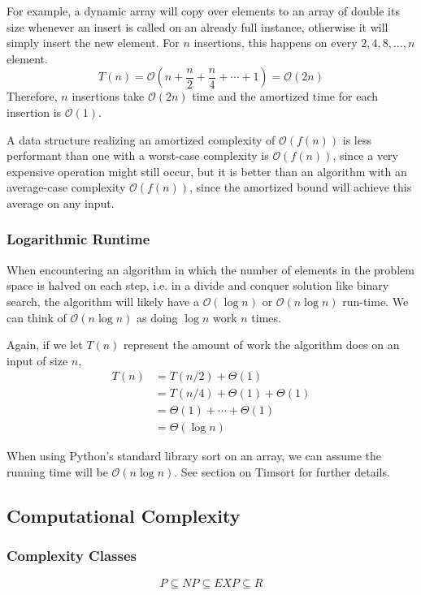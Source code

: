 \documentclass{article}
\newcommand{\bigO}{\mathcal{O}}
\begin{document}
    For example, a dynamic array will copy over elements to an array of double its size whenever an insert is called on an already full instance, otherwise it will simply insert the new element. For $n$ insertions, this happens on every $2, 4, 8, ..., n$ element.
    \[
        T(n) = \bigO ( n + \frac{n}{2} + \frac{n}{4} + \cdots + 1) 
        = \bigO(2n) 
    \]
    Therefore, $n$ insertions take $\bigO(2n)$ time and the amortized time for each insertion is $\bigO(1)$. 
    
    A data structure realizing an amortized complexity of $\bigO (f(n))$ is less performant than one with a worst-case complexity is $\bigO(f(n))$, since a very expensive operation might still occur, but it is better than an algorithm with an average-case complexity $\bigO(f(n))$, since the amortized bound will achieve this average on any input.
    
    \subsubsection{Logarithmic Runtime}
    When encountering an algorithm in which the number of elements in the problem space is halved on each step, i.e. in a divide and conquer solution like binary search, the algorithm will likely have a $\bigO(\log n)$ or $\bigO(n \log n)$ run-time. We can think of $\bigO(n \log n)$ as doing $\log n$ work $n$ times. 
    
    Again, if we let $T(n)$ represent the amount of work the algorithm does on an input of size $n$,
    \begin{align*}
        T(n) &= T(n/2) + \Theta(1) \\
        &=  T(n/4)+ \Theta(1) + \Theta(1) \\ 
        &= \Theta(1) + \cdots + \Theta(1) \\
        &= \Theta(\log n ) 
    \end{align*}
    
    When using Python's standard library sort on an array, we can assume the running time will be $\bigO (n \log n)$. See section on Timsort for further details.
    
    \subsection{Computational Complexity}
    \subsubsection{Complexity Classes}
    \[
        P \subseteq NP \subseteq EXP \subseteq R
    \]
    
\end{document}
